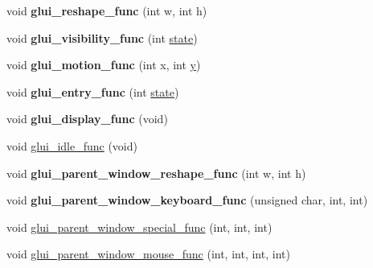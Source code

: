 \begin{DoxyCompactItemize}
\item 
\hypertarget{class_g_l_u_i___main_a1798681d4deaa39c807e49c3902fde96}{void {\bfseries glui\+\_\+reshape\+\_\+func} (int w, int h)}\label{class_g_l_u_i___main_a1798681d4deaa39c807e49c3902fde96}

\item 
\hypertarget{class_g_l_u_i___main_a98726addbd2797b8134ac2b654c3cee6}{void {\bfseries glui\+\_\+visibility\+\_\+func} (int \hyperlink{structstate}{state})}\label{class_g_l_u_i___main_a98726addbd2797b8134ac2b654c3cee6}

\item 
\hypertarget{class_g_l_u_i___main_a633765a3cd774bd7521a679eb4a51f2f}{void {\bfseries glui\+\_\+motion\+\_\+func} (int x, int \hyperlink{_ice_utils_8h_aa7ffaed69623192258fb8679569ff9ba}{y})}\label{class_g_l_u_i___main_a633765a3cd774bd7521a679eb4a51f2f}

\item 
\hypertarget{class_g_l_u_i___main_ac1a3c6ebc56cb90a076c62b9192853e8}{void {\bfseries glui\+\_\+entry\+\_\+func} (int \hyperlink{structstate}{state})}\label{class_g_l_u_i___main_ac1a3c6ebc56cb90a076c62b9192853e8}

\item 
\hypertarget{class_g_l_u_i___main_a02c2a5886dd1faabe8b882da67f77457}{void {\bfseries glui\+\_\+display\+\_\+func} (void)}\label{class_g_l_u_i___main_a02c2a5886dd1faabe8b882da67f77457}

\item 
void \hyperlink{class_g_l_u_i___main_a6d56019c7f67cab2a97457b11e0b8994}{glui\+\_\+idle\+\_\+func} (void)
\item 
\hypertarget{class_g_l_u_i___main_aba8acedae32a786d382d229db7728ee4}{void {\bfseries glui\+\_\+parent\+\_\+window\+\_\+reshape\+\_\+func} (int w, int h)}\label{class_g_l_u_i___main_aba8acedae32a786d382d229db7728ee4}

\item 
\hypertarget{class_g_l_u_i___main_aff7ae88a0a9221d06fd6712875970c58}{void {\bfseries glui\+\_\+parent\+\_\+window\+\_\+keyboard\+\_\+func} (unsigned char, int, int)}\label{class_g_l_u_i___main_aff7ae88a0a9221d06fd6712875970c58}

\item 
void \hyperlink{class_g_l_u_i___main_ab729b572b9acaffe3ebc827b6cfd72ca}{glui\+\_\+parent\+\_\+window\+\_\+special\+\_\+func} (int, int, int)
\item 
void \hyperlink{class_g_l_u_i___main_a391c1191451c678e7702e593e74dc5a4}{glui\+\_\+parent\+\_\+window\+\_\+mouse\+\_\+func} (int, int, int, int)
\end{DoxyCompactItemize}
